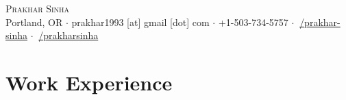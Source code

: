 \documentclass[article,10pt]{article}
\begin{document}
\pagestyle{empty} %

\begin{center}
	{\Huge \scshape {Prakhar Sinha}}\\
	Portland, OR $\cdot$ prakhar1993 [at] gmail [dot] com $\cdot$ +1-503-734-5757 $\cdot$ \href{https://linkedin.com/in/prakhar-sinha/}{\faLinkedinSquare $\:$/prakhar-sinha}  $\cdot$ \href{https://github.com/prakharsinha}{\faGithubSquare $\:$/prakharsinha}\\
\end{center}
 

\section{Work Experience}
\end{document}
